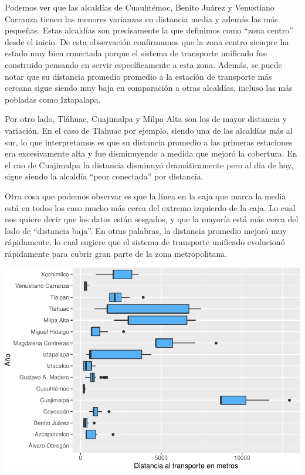 \documentclass[
  spanish,
]{article}
\begin{document}
Podemos ver que las alcaldías de Cuauhtémoc, Benito Juárez y Venustiano
Carranza tienen las menores varianzas en distancia media y además las
más pequeñas. Estas alcaldías son precisamente la que definimos como
``zona centro'' desde el inicio. De esta observación confirmamos que la
zona centro siempre ha estado muy bien conectada porque el sistema de
transporte unificado fue construido pensando en servir específicamente a
esta zona. Además, se puede notar que su distancia promedio promedio a
la estación de transporte más cercana sigue siendo muy baja en
comparación a otras alcaldías, incluso las más pobladas como Iztapalapa.

Por otro lado, Tláhuac, Cuajimalpa y Milpa Alta son los de mayor
distancia y variación. En el caso de Tlahuac por ejemplo, siendo una de
las alcaldías más al sur, lo que interpretamos es que su distancia
promedio a las primeras estaciones era excesivamente alta y fue
disminuyendo a medida que mejoró la cobertura. En el cao de Cuajimalpa
la distancia disminuyó dramáticamente pero al día de hoy, sigue siendo
la alcaldía ``peor conectada'' por distancia.

Otra cosa que podemos observar es que la línea en la caja que marca la
media está en todos los caso mucho más cerca del extremo izquierdo de la
caja. Lo cual nos quiere decir que los datos están sesgados, y que la
mayoría está más cerca del lado de ``distancia baja''. En otras
palabras, la distancia promedio mejoró muy rápidamente, lo cual sugiere
que el sistema de transporte unificado evolucionó rápidamente para
cubrir gran parte de la zona metropolitana.

\begin{center}\includegraphics{proyecto_files/figure-latex/unnamed-chunk-8-1} \end{center}
\end{document}
